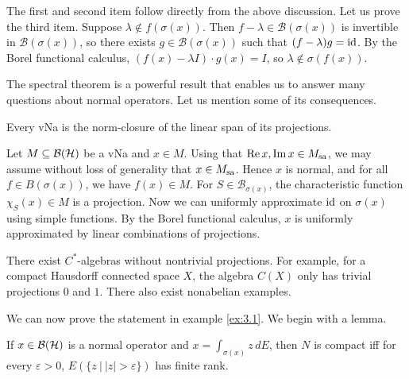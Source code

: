 \begin{myproof}
  The first and second item follow directly from the above discussion. 
  Let us prove the third item.
  Suppose $\lambda \notin f(\sigma (x))$. Then $f - \lambda \in \mathcal{B} (\sigma(x))$
    is invertible in $\mathcal{B}(\sigma(x))$, so there exists $g \in \mathcal{B} (\sigma(x))$ such that $(f - \lambda) g = \operatorname{id}$.
    By the Borel functional calculus, $(f(x) - \lambda I) \cdot g(x) = I$, so $\lambda \notin \sigma(f(x))$. 
\end{myproof}

The spectral theorem is a powerful result that enables us to answer many questions about normal operators.
Let us mention some of its consequences.

\begin{corollary}
  Every vNa is the norm-closure of the linear span of its projections.
\end{corollary}

\begin{myproof}
  Let $M \subseteq \operatorname{\mathcal{B} (\mathcal{H})}$ be a vNa and $x \in M$. Using that $\operatorname{Re} x, \operatorname{Im} x \in M_{\operatorname{sa}}$,
  we may assume without loss of generality that $x \in M_{\operatorname{sa}}$. Hence $x$ is normal, and for all $f \in B(\sigma(x))$, we have $f(x) \in M$.
  For $S \in \mathcal{B}_{\sigma(x)}$, the characteristic function $\chi_S (x) \in M$ is a projection. 
  Now we can uniformly approximate $\operatorname{id}$ on $\sigma(x)$ using simple functions. By the Borel functional calculus, 
  $x$ is uniformly approximated by linear combinations of projections.
\end{myproof}

\begin{remark}
  There exist $C^*$-algebras without nontrivial projections.
  For example, for a compact Hausdorff connected space $X$, the algebra $C(X)$ only has trivial projections $0$ and $1$.
  There also exist nonabelian examples.            
\end{remark}

We can now prove the statement in example \ref{ex:3.1}. We begin with a lemma.

\begin{lemma}
  If $x \in \operatorname{\mathcal{B} (\mathcal{H})}$ is a normal operator and $x = \int_{\sigma(x)} z\, dE$, then $N$ is compact iff for every $\varepsilon > 0$,
  $E(\{z\ |\ |z| > \varepsilon\})$ has finite rank.
\end{lemma}

